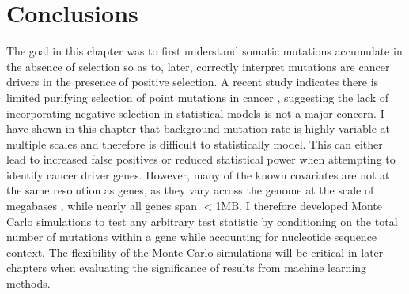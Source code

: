 \section{Conclusions}

The goal in this chapter was to first understand  somatic mutations accumulate in the absence of selection so as to, later, correctly interpret  mutations are cancer drivers in the presence of positive selection. A recent study indicates there is limited purifying selection of point mutations in cancer \cite{RN56}, suggesting the lack of incorporating negative selection in statistical models is not a major concern. I have shown in this chapter that background mutation rate is highly variable at multiple scales and therefore is difficult to statistically model. This can either lead to increased false positives or reduced statistical power when attempting to identify cancer driver genes. However, many of the known covariates are not at the same resolution as genes, as they vary across the genome at the scale of megabases \cite{RN74}, while nearly all genes span $<$1MB. I therefore developed Monte Carlo simulations to test any arbitrary test statistic by conditioning on the total number of mutations within a gene while accounting for nucleotide sequence context. The flexibility of the Monte Carlo simulations will be critical in later chapters when evaluating the significance of results from machine learning methods. 